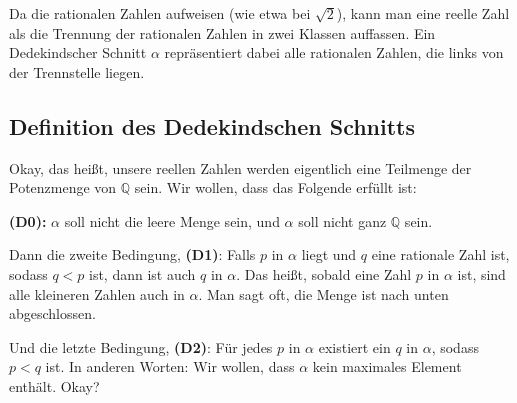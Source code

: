\begin{math-stroke}
\begin{center}
\end{center}

\begin{explanation-of-steps}
Da die rationalen Zahlen  aufweisen (wie etwa bei $\sqrt{2}$), kann man eine reelle Zahl als die Trennung der rationalen Zahlen in zwei Klassen auffassen. Ein Dedekindscher Schnitt $\alpha$ repräsentiert dabei alle rationalen Zahlen, die links von der Trennstelle liegen.
\end{explanation-of-steps}
\end{math-stroke}

\subsection{Definition des Dedekindschen Schnitts}

\begin{spoken-clean}[00:25:30 - 00:27:30]
Okay, das heißt, unsere reellen Zahlen werden eigentlich eine Teilmenge der Potenzmenge von $\mathbb{Q}$ sein. Wir wollen, dass das Folgende erfüllt ist:

\textbf{(D0):} $\alpha$ soll nicht die leere Menge sein, und $\alpha$ soll nicht ganz $\mathbb{Q}$ sein.

Dann die zweite Bedingung, \textbf{(D1)}: Falls $p$ in $\alpha$ liegt und $q$ eine rationale Zahl ist, sodass $q < p$ ist, dann ist auch $q$ in $\alpha$. Das heißt, sobald eine Zahl $p$ in $\alpha$ ist, sind alle kleineren Zahlen auch in $\alpha$. Man sagt oft, die Menge ist nach unten abgeschlossen.

Und die letzte Bedingung, \textbf{(D2)}: Für jedes $p$ in $\alpha$ existiert ein $q$ in $\alpha$, sodass $p < q$ ist. In anderen Worten: Wir wollen, dass $\alpha$ kein maximales Element enthält. Okay?
\end{spoken-clean}

